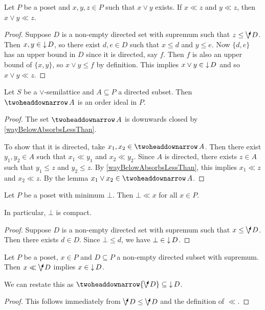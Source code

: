 \begin{lemma} \label{joinWayBelow}
Let $P$ be a poset and $x,y,z\in P$ such that $x\vee y$ exists. If $x\ll z$ and $y \ll z$, then $x\vee y \ll z$.
\end{lemma}
\begin{proof}
Suppose $D$ is a non-empty directed set with supremum such that $z\leq \dirvee D$. Then $x, y\in \operatorname{\downarrow} D$, so there exist $d,e\in D$ such that $x\leq d$ and $y\leq e$. Now $\{d,e\}$ has an upper bound in $D$ since it is directed, say $f$. Then $f$ is also an upper bound of $\{x,y\}$, so $x\vee y \leq f$ by definition. This implies $x\vee y \in \operatorname{\downarrow} D$ and so $x\vee y \ll z$.
\end{proof}
\begin{corollary} \label{ddownsetOrderIdealInJoinSemilattice}
Let $S$ be a $\vee$-semilattice and $A\subseteq P$ a directed subset. Then $\ddownset A$ is an order ideal in $P$.
\end{corollary}
\begin{proof}
The set $\ddownset A$ is downwards closed by \ref{wayBelowAbsorbsLessThan}.

To show that it is directed, take $x_1,x_2 \in \ddownset A$. Then there exist $y_1, y_2\in A$ such that $x_1 \ll y_1$ and $x_2 \ll y_2$. Since $A$ is directed, there exists $z\in A$ such that $y_1\leq z$ and $y_2\leq z$. By \ref{wayBelowAbsorbsLessThan}, this implies $x_1 \ll z$ and $x_2 \ll z$. By the lemma $x_1\vee x_2 \in \ddownset A$.
\end{proof}

\begin{lemma}
Let $P$ be a poset with minimum $\bot$. Then $\bot \ll x$ for all $x\in P$.
\end{lemma}
In particular, $\bot$ is compact.
\begin{proof}
Suppose $D$ is a non-empty directed set with supremum such that $x\leq \dirvee D$. Then there exists $d\in D$. Since $\bot \leq d$, we have $\bot \in\operatorname{\downarrow} D$. 
\end{proof}

\begin{lemma} \label{wayBelowDirectedSup}
Let $P$ be a poset, $x\in P$ and $D\subseteq P$ a non-empty directed subset with supremum. Then $x \ll \dirvee D$ implies $x\in \operatorname{\downarrow} D$.
\end{lemma}
We can restate this as $\ddownset\{\dirvee D\} \subseteq \downset D$.
\begin{proof}
This follows immediately from $\dirvee D \leq \dirvee D$ and the definition of $\ll$.
\end{proof}

